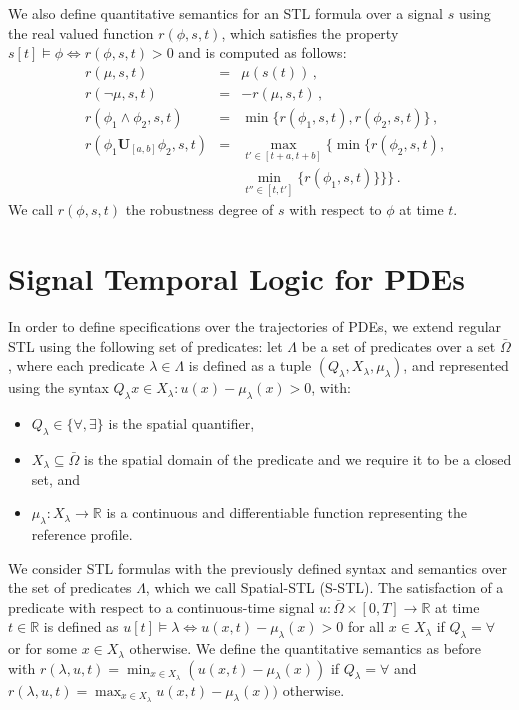 \documentclass[letterpaper, 10 pt, conference]{ieeeconf/ieeeconf}
\newcommand*{\R}{\mathbb{R}}
\newcommand{\luntil}{\mathbf{U}}
\begin{document}
We also define quantitative semantics for an STL formula over a signal $s$
using the real valued function $r(\phi, s, t)$, which satisfies the property $s[t]
\models \phi \iff r(\phi,s, t) > 0$ and is computed as follows:
%
\begin{equation}
    \begin{aligned}
        &r(\mu, s, t) &= &\mu(s(t)) \,, \\
        &r(\lnot \mu, s, t) &= &-r(\mu, s,t) \,, \\
        &r(\phi_1 \land \phi_2, s, t) &= &\min\{r(\phi_1,s, t),
    r(\phi_2,s, t)\} \,, \\
    &r(\phi_1 \luntil_{[a,b]} \phi_2,s, t) &= 
    &\max_{t' \in [t+a, t+b]} \biggl\{ \min \bigl\{ r(\phi_2,s, t), \\
    & & &\min_{t'' \in [t, t']}\{r(\phi_1,s, t)\} \bigr\} \biggr\} \,.
    \end{aligned}
\end{equation}
%
We call $r(\phi,s, t)$ the robustness degree of $s$ with respect to $\phi$ at
time $t$.

\section{Signal Temporal Logic for PDEs}
\label{sec:signal_temporal_logic_for_pdes}

In order to define specifications over the trajectories of PDEs, we extend
regular STL using the following set of predicates:
let $\Lambda$ be a set of predicates over
a set $\bar\Omega$, where each predicate $\lambda \in \Lambda$ is defined as a
tuple $(Q_\lambda, X_\lambda, \mu_\lambda)$, 
and represented using the syntax $Q_\lambda x \in X_\lambda : u(x) - \mu_\lambda(x) >
0$, with:

\begin{itemize}
    \item $Q_\lambda \in \{\forall, \exists\}$ is the spatial quantifier,
    \item $X_\lambda \subseteq \bar\Omega$ is the spatial domain of the predicate and
        we require it to be a closed set, and 
    \item $\mu_\lambda : X_\lambda \to \R$ is a continuous and differentiable function 
        representing the reference profile.
\end{itemize}

We consider STL formulas 
with the previously defined syntax and semantics 
over the set of predicates $\Lambda$, which we call Spatial-STL (S-STL). The satisfaction of a
predicate with respect to a continuous-time signal $u : \bar\Omega \times [0, T]
\to \R$ at time $t \in \R$ is defined as $u[t] \models \lambda \iff 
u(x, t) - \mu_\lambda(x) > 0$ for all $x \in X_\lambda$ if $Q_\lambda = \forall$ or for some $x \in
X_\lambda$ otherwise. We define the quantitative semantics as before with
$r(\lambda,u, t) = \min_{x \in X_\lambda} (u(x, t) - \mu_\lambda(x))$ if $Q_\lambda = \forall$ and
$r(\lambda,u, t) = \max_{x \in X_\lambda} u(x, t) - \mu_\lambda(x))$ otherwise.
\end{document}
